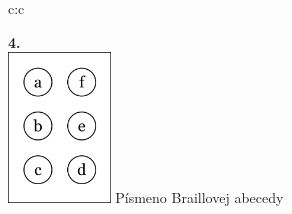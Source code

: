 \documentclass[10pt]{report}
\begin{document}
\begin{tabular}{c:c}
\begin{minipage}[c][104.5mm][t]{0.5\linewidth}
\begin{center}
\begin{minipage}{0.79\linewidth}
\begin{center}
\begin{varwidth}{\linewidth}
\begin{enumerate}
\end{enumerate}
\end{varwidth}
\end{center}
\end{minipage}
\begin{minipage}{0.20\linewidth}
\begin{center}
{\Huge\bfseries 4.} \\[2mm]
\includegraphics[height=40mm]{../images/braille.png}
{\small Písmeno Braillovej abecedy}
\end{center}
\end{minipage}
\end{center}
\end{minipage}
%
\end{tabular}
\newpage
\end{document}

